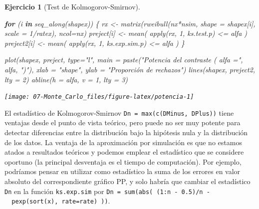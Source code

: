 \documentclass[
]{book}
\newenvironment{Shaded}{\begin{snugshade}}{\end{snugshade}}
\newcommand{\AttributeTok}[1]{\textcolor[rgb]{0.77,0.63,0.00}{#1}}
\newcommand{\ControlFlowTok}[1]{\textcolor[rgb]{0.13,0.29,0.53}{\textbf{#1}}}
\newcommand{\DecValTok}[1]{\textcolor[rgb]{0.00,0.00,0.81}{#1}}
\newcommand{\FunctionTok}[1]{\textcolor[rgb]{0.00,0.00,0.00}{#1}}
\newcommand{\NormalTok}[1]{#1}
\newcommand{\OtherTok}[1]{\textcolor[rgb]{0.56,0.35,0.01}{#1}}
\newcommand{\SpecialCharTok}[1]{\textcolor[rgb]{0.00,0.00,0.00}{#1}}
\newcommand{\StringTok}[1]{\textcolor[rgb]{0.31,0.60,0.02}{#1}}
\theoremstyle{break}
\newtheorem{exercise}{Ejercicio}[chapter]
\theoremstyle{nonumberplain}
\begin{document}
\begin{exercise}[Test de Kolmogorov-Smirnov]
\begin{enumerate}
\begin{Shaded}
\begin{Highlighting}[]
\ControlFlowTok{for}\NormalTok{ (i }\ControlFlowTok{in} \FunctionTok{seq\_along}\NormalTok{(shapex)) \{ }
\NormalTok{  rx }\OtherTok{\textless{}{-}} \FunctionTok{matrix}\NormalTok{(}\FunctionTok{rweibull}\NormalTok{(nx}\SpecialCharTok{*}\NormalTok{nsim, }\AttributeTok{shape =}\NormalTok{ shapex[i], }\AttributeTok{scale =} \DecValTok{1}\SpecialCharTok{/}\NormalTok{ratex), }\AttributeTok{ncol=}\NormalTok{nx)}
\NormalTok{  preject[i] }\OtherTok{\textless{}{-}} \FunctionTok{mean}\NormalTok{( }\FunctionTok{apply}\NormalTok{(rx, }\DecValTok{1}\NormalTok{, ks.test.p) }\SpecialCharTok{\textless{}=}\NormalTok{ alfa )}
\NormalTok{  preject2[i] }\OtherTok{\textless{}{-}} \FunctionTok{mean}\NormalTok{( }\FunctionTok{apply}\NormalTok{(rx, }\DecValTok{1}\NormalTok{, ks.exp.sim.p) }\SpecialCharTok{\textless{}=}\NormalTok{ alfa )}
\NormalTok{\}}

\FunctionTok{plot}\NormalTok{(shapex, preject, }\AttributeTok{type=}\StringTok{"l"}\NormalTok{, }\AttributeTok{main =} \FunctionTok{paste}\NormalTok{(}\StringTok{"Potencia del contraste ( alfa ="}\NormalTok{, alfa, }\StringTok{")"}\NormalTok{), }
     \AttributeTok{xlab =} \StringTok{"shape"}\NormalTok{, }\AttributeTok{ylab =} \StringTok{"Proporción de rechazos"}\NormalTok{)}
\FunctionTok{lines}\NormalTok{(shapex, preject2, }\AttributeTok{lty =} \DecValTok{2}\NormalTok{)}
\FunctionTok{abline}\NormalTok{(}\AttributeTok{h =}\NormalTok{ alfa, }\AttributeTok{v =} \DecValTok{1}\NormalTok{, }\AttributeTok{lty =} \DecValTok{3}\NormalTok{)}
\end{Highlighting}
\end{Shaded}

  \begin{center}\texttt{[image: 07-Monte\_Carlo\_files/figure-latex/potencia-1]} \end{center}
\end{enumerate}

\end{exercise}

El estadístico de Kolmogorov-Smirnov \texttt{Dn\ =\ max(c(DMinus,\ DPlus))} tiene ventajas desde el
punto de vista teórico, pero puede no ser muy potente para detectar diferencias entre la
distribución bajo la hipótesis nula y la distribución de los datos.
La ventaja de la aproximación por simulación es que no estamos atados a resultados teóricos
y podemos emplear el estadístico que se considere oportuno
(la principal desventaja es el tiempo de computación).
Por ejemplo, podríamos pensar en utilizar como estadístico la suma de los errores en
valor absoluto del correspondiente gráfico PP, y solo habría que cambiar el estadístico
\texttt{Dn} en la función \texttt{ks.exp.sim} por \texttt{Dn\ =\ sum(abs(\ (1:n\ -\ 0.5)/n\ -\ \ pexp(sort(x),\ rate=rate)\ ))}.
\end{document}
